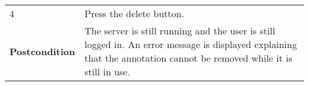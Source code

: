 \begin{longtable}[c]{@{}ll@{}}
\begin{minipage}[t]{0.31\columnwidth}\raggedright\strut
4
\strut\end{minipage} &
\begin{minipage}[t]{0.63\columnwidth}\raggedright\strut
Press the delete button.
\strut\end{minipage}\tabularnewline
\begin{minipage}[t]{0.31\columnwidth}\raggedright\strut
\textbf{Postcondition}
\strut\end{minipage} &
\begin{minipage}[t]{0.63\columnwidth}\raggedright\strut
The server is still running and the user is still logged in. An error
message is displayed explaining that the annotation cannot be removed
while it is still in use.
\strut\end{minipage}\tabularnewline
\bottomrule
\end{longtable}

